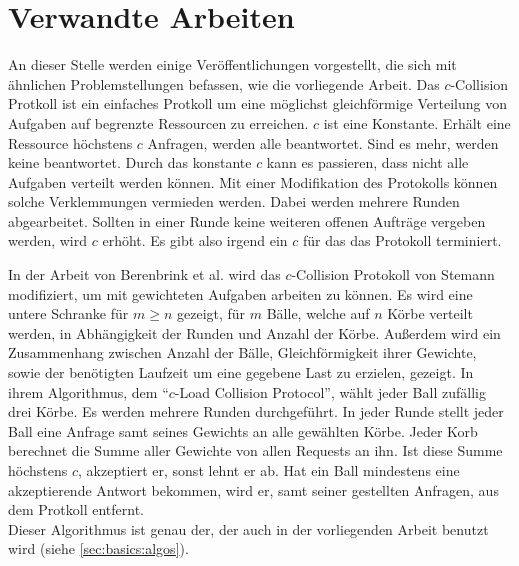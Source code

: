 \chapter{Verwandte Arbeiten}
\label{chap:relwork}
%
An dieser Stelle werden einige Veröffentlichungen vorgestellt, die sich mit ähnlichen Problemstellungen befassen, wie die vorliegende Arbeit.
%
%
Das $c$-Collision Protkoll \cite{ccol3} ist ein einfaches Protkoll um eine möglichst gleichförmige Verteilung von Aufgaben auf begrenzte Ressourcen zu erreichen. $c$ ist eine Konstante. Erhält eine Ressource höchstens $c$ Anfragen, werden alle beantwortet. Sind es mehr, werden keine beantwortet. Durch das konstante $c$ kann es passieren, dass nicht alle Aufgaben verteilt werden können. Mit einer Modifikation des Protokolls können solche Verklemmungen vermieden werden. Dabei werden mehrere Runden abgearbeitet. Sollten in einer Runde keine weiteren offenen Aufträge vergeben werden, wird $c$ erhöht. Es gibt also irgend ein $c$ für das das Protokoll terminiert. 

In der Arbeit von Berenbrink et al. \cite{ccol2} wird das $c$-Collision Protokoll von Stemann \cite{ccol3} modifiziert, um mit gewichteten Aufgaben arbeiten zu können. Es wird eine untere Schranke für $m \ge n$ gezeigt, für $m$ Bälle, welche auf $n$ Körbe verteilt werden, in Abhängigkeit der Runden und Anzahl der Körbe. Außerdem wird ein Zusammenhang zwischen Anzahl der Bälle, Gleichförmigkeit ihrer Gewichte, sowie der benötigten Laufzeit um eine gegebene Last zu erzielen, gezeigt. In ihrem Algorithmus, dem "`$c$-Load Collision Protocol"', wählt jeder Ball zufällig drei Körbe. Es werden mehrere Runden durchgeführt. In jeder Runde stellt jeder Ball eine Anfrage samt seines Gewichts an alle gewählten Körbe. Jeder Korb berechnet die Summe aller Gewichte von allen Requests an ihn. Ist diese Summe höchstens $c$, akzeptiert er, sonst lehnt er ab. Hat ein Ball mindestens eine akzeptierende Antwort bekommen, wird er, samt seiner gestellten Anfragen, aus dem Protkoll entfernt.\\
%
Dieser Algorithmus ist genau der, der auch in der vorliegenden Arbeit benutzt wird (siehe \ref{sec:basics:algos}).
